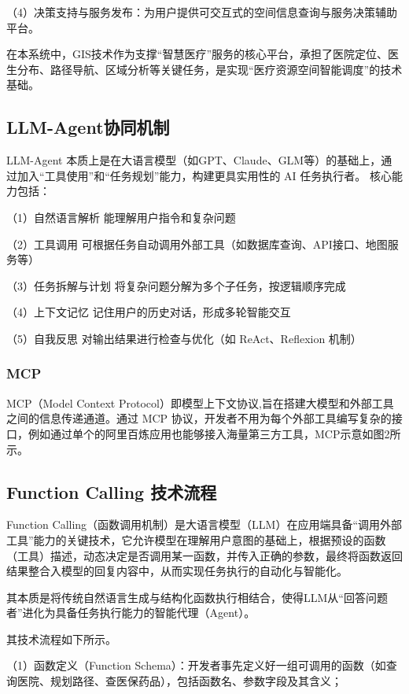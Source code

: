 \documentclass[fleqn,10pt]{IntroToAI} %
\begin{document}
（4）决策支持与服务发布：为用户提供可交互式的空间信息查询与服务决策辅助平台。

在本系统中，GIS技术作为支撑“智慧医疗”服务的核心平台，承担了医院定位、医生分布、路径导航、区域分析等关键任务，是实现“医疗资源空间智能调度”的技术基础。


\subsection{LLM-Agent协同机制}

LLM-Agent 本质上是在大语言模型（如GPT、Claude、GLM等）的基础上，通过加入“工具使用”和“任务规划”能力，构建更具实用性的 AI 任务执行者。
核心能力包括：

（1）自然语言解析	能理解用户指令和复杂问题

（2）工具调用	可根据任务自动调用外部工具（如数据库查询、API接口、地图服务等）

（3）任务拆解与计划	将复杂问题分解为多个子任务，按逻辑顺序完成

（4）上下文记忆	记住用户的历史对话，形成多轮智能交互

（5）自我反思	对输出结果进行检查与优化（如 ReAct、Reflexion 机制）


\subsubsection{MCP}
 MCP（Model Context Protocol）即模型上下文协议,旨在搭建大模型和外部工具之间的信息传递通道。通过 MCP 协议，开发者不用为每个外部工具编写复杂的接口，例如通过单个的阿里百炼应用也能够接入海量第三方工具，MCP示意如图2所示。
 

\subsection{Function Calling 技术流程}

Function Calling（函数调用机制）是大语言模型（LLM）在应用端具备“调用外部工具”能力的关键技术，它允许模型在理解用户意图的基础上，根据预设的函数（工具）描述，动态决定是否调用某一函数，并传入正确的参数，最终将函数返回结果整合入模型的回复内容中，从而实现任务执行的自动化与智能化。

其本质是将传统自然语言生成与结构化函数执行相结合，使得LLM从“回答问题者”进化为具备任务执行能力的智能代理（Agent）。

其技术流程如下所示。

（1）函数定义（Function Schema）：开发者事先定义好一组可调用的函数（如查询医院、规划路径、查医保药品），包括函数名、参数字段及其含义；
\end{document}
